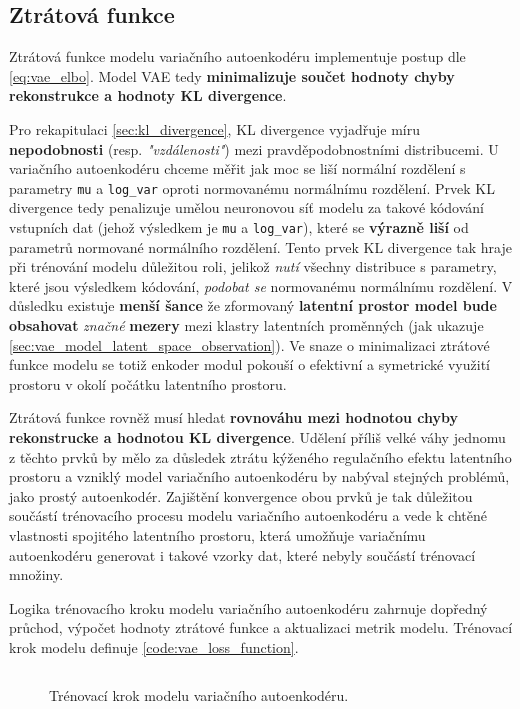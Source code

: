 \subsection{Ztrátová funkce}
\label{sec:vae_model_loss_function}
Ztrátová funkce modelu variačního autoenkodéru implementuje postup dle \autoref{eq:vae_elbo}.
Model VAE tedy \textbf{minimalizuje součet hodnoty chyby rekonstrukce a hodnoty KL divergence}.

Pro rekapitulaci \autoref{sec:kl_divergence}, KL divergence vyjadřuje míru \textbf{nepodobnosti} (resp. \emph{"vzdálenosti"}) mezi pravděpodobnostními distribucemi.
U variačního autoenkodéru chceme měřit jak moc se liší normální rozdělení s parametry \lstinline{mu} a \lstinline{log_var} oproti normovanému normálnímu rozdělení.
Prvek KL divergence tedy penalizuje umělou neuronovou síť modelu za takové kódování vstupních dat (jehož výsledkem je \lstinline{mu} a \lstinline{log_var}), které se \textbf{výrazně liší} od parametrů normované normálního rozdělení.
Tento prvek KL divergence tak hraje při trénování modelu důležitou roli, jelikož \emph{nutí} všechny distribuce s parametry, které jsou výsledkem kódování, \emph{podobat se} normovanému normálnímu rozdělení. 
V důsledku existuje \textbf{menší šance} že zformovaný \textbf{latentní prostor model bude obsahovat} \emph{značné} \textbf{mezery} mezi klastry latentních proměnných (jak ukazuje \autoref{sec:vae_model_latent_space_observation}).
Ve snaze o minimalizaci ztrátové funkce modelu se totiž enkoder modul pokouší o efektivní a symetrické využití prostoru v okolí počátku latentního prostoru.

Ztrátová funkce rovněž musí hledat \textbf{rovnováhu mezi hodnotou chyby rekonstrucke a hodnotou KL divergence}.
Udělení příliš velké váhy jednomu z těchto prvků by mělo za důsledek ztrátu kýženého regulačního efektu latentního prostoru a vzniklý model variačního autoenkodéru by nabýval stejných problémů, jako prostý autoenkodér.
Zajištění konvergence obou prvků je tak důležitou součástí trénovacího procesu modelu variačního autoenkodéru a vede k chtěné vlastnosti spojitého latentního prostoru, která umožňuje variačnímu autoenkodéru generovat i takové vzorky dat, které nebyly součástí trénovací množiny.

Logika trénovacího kroku modelu variačního autoenkodéru zahrnuje dopředný průchod, výpočet hodnoty ztrátové funkce a aktualizaci metrik modelu.
Trénovací krok modelu definuje \autoref{code:vae_loss_function}.

\newpage
\begin{figure}[H]
    \inputminted[linenos]{python}{code_snippets/vae_loss_function.py}
    \caption{Trénovací krok modelu variačního autoenkodéru.}
    \label{code:vae_loss_function}
\end{figure}


